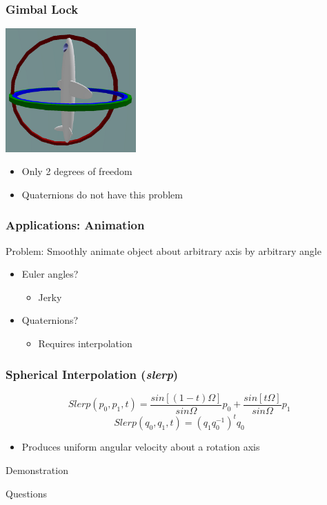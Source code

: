 \documentclass[serif,mathserif]{beamer}
\begin{document}
\begin{frame}
  \frametitle{Gimbal Lock}
  \centering
  \includegraphics[width=5cm]{Images/gimbal_lock.png}
  \begin{itemize}
    \item Only 2 degrees of freedom
    \item Quaternions do not have this problem
  \end{itemize}
\end{frame}


\begin{frame}
  \frametitle{Applications: Animation}
  Problem: Smoothly animate object about arbitrary axis by arbitrary angle \pause
  \begin{itemize}
    \item Euler angles?
    \begin{itemize}
      \item Jerky  \pause
    \end{itemize}
    \item Quaternions? 
    \begin{itemize}
      \item Requires interpolation
    \end{itemize}
  \end{itemize}
  
\end{frame}

\begin{frame}
  \frametitle{Spherical Interpolation (\textit{slerp})}
  \centering
  $$ Slerp(p_0, p_1, t) = \frac{sin[(1-t)\Omega]}{sin\Omega}p_0 + \frac{sin[t\Omega]}{sin\Omega}p_1 $$
  \vspace{0.3cm}
  $$ Slerp(q_0, q_1, t) = (q_1q_0^{-1})^tq_0 $$
  \begin{itemize}
    \item Produces uniform angular velocity about a rotation axis
  \end{itemize}
  
\end{frame}

\begin{frame}
  \centering
  \huge
  Demonstration
\end{frame}

\begin{frame}
  \centering
  \huge
  Questions
\end{frame}
\end{document}
